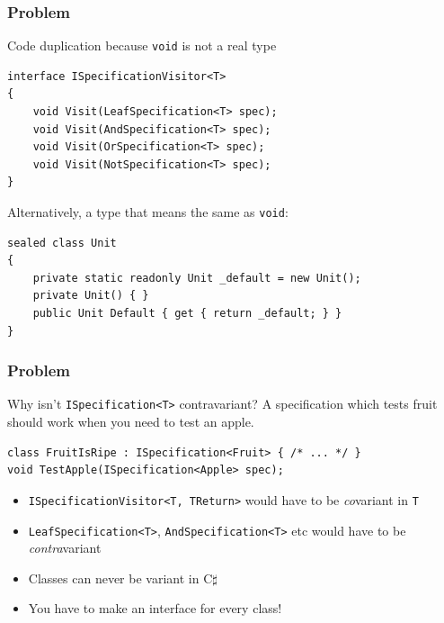 \documentclass{beamer}
\begin{document}
  \begin{frame}[fragile]
    \frametitle{Problem}
    Code duplication because \texttt{void} is not a real type
    
    \begin{verbatim}
interface ISpecificationVisitor<T>
{
    void Visit(LeafSpecification<T> spec);
    void Visit(AndSpecification<T> spec);
    void Visit(OrSpecification<T> spec);
    void Visit(NotSpecification<T> spec);
}
    \end{verbatim}
    
    Alternatively, a type that means the same as \texttt{void}:
    
    \begin{verbatim}
sealed class Unit
{
    private static readonly Unit _default = new Unit();
    private Unit() { }
    public Unit Default { get { return _default; } }
}
    \end{verbatim}
\end{frame}

  \begin{frame}[fragile]
    \frametitle{Problem}
    Why isn't \texttt{ISpecification<T>} contravariant?
    A specification which tests fruit should work when you need to test an apple.
    
    \begin{verbatim}
class FruitIsRipe : ISpecification<Fruit> { /* ... */ }
void TestApple(ISpecification<Apple> spec);
    \end{verbatim}
    
    \begin{itemize}
      \item \texttt{ISpecificationVisitor<T, TReturn>} would have to be \emph{co}variant in \texttt{T}
      \item \texttt{LeafSpecification<T>}, \texttt{AndSpecification<T>} etc would have to be \emph{contra}variant
      \item Classes can never be variant in C$\sharp$
      \item You have to make an interface for every class!
    \end{itemize}
\end{frame}
\end{document}
